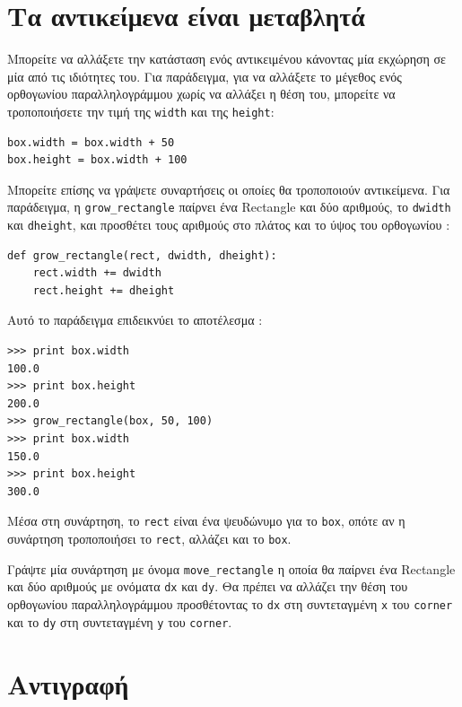 \documentclass[10pt]{book}
\begin{document}
 
\section{Τα αντικείμενα είναι μεταβλητά}

Μπορείτε να αλλάξετε την κατάσταση ενός αντικειμένου κάνοντας μία εκχώρηση σε μία από τις ιδιότητες του. 
Για παράδειγμα, για να αλλάξετε το μέγεθος ενός ορθογωνίου παραλληλογράμμου χωρίς να αλλάξει η θέση του, μπορείτε να 
τροποποιήσετε την τιμή της  {\tt width}  και της  {\tt height}:

\begin{verbatim}
box.width = box.width + 50
box.height = box.width + 100
\end{verbatim}
%
 Μπορείτε επίσης να γράψετε συναρτήσεις οι οποίες θα τροποποιούν αντικείμενα. Για παράδειγμα, η  \verb"grow_rectangle"  παίρνει ένα  Rectangle  και δύο αριθμούς, το  {\tt dwidth}  και  {\tt dheight},  και προσθέτει τους αριθμούς 
στο πλάτος και το ύψος του ορθογωνίου :

\begin{verbatim}
def grow_rectangle(rect, dwidth, dheight):
    rect.width += dwidth
    rect.height += dheight
\end{verbatim}
%
 Αυτό το παράδειγμα επιδεικνύει το αποτέλεσμα :

\begin{verbatim}
>>> print box.width
100.0
>>> print box.height
200.0
>>> grow_rectangle(box, 50, 100)
>>> print box.width
150.0
>>> print box.height
300.0
\end{verbatim}
%
 Μέσα στη συνάρτηση, το  {\tt rect}  είναι ένα ψευδώνυμο για το  {\tt box},  οπότε αν η συνάρτηση τροποποιήσει το  
{\tt rect},  αλλάζει και το  {\tt box}.

\begin{exercise}

Γράψτε μία συνάρτηση με όνομα  \verb"move_rectangle"  η οποία θα παίρνει ένα  Rectangle  και δύο αριθμούς με ονόματα  {\tt dx}  και  {\tt dy}.   Θα πρέπει να αλλάζει την θέση του ορθογωνίου παραλληλογράμμου προσθέτοντας το  {\tt dx}  στη συντεταγμένη  {\tt x}  του  {\tt corner}  και το  {\tt dy}  στη συντεταγμένη  {\tt y}  του  {\tt corner}. 
\end{exercise}



\section{Αντιγραφή}
\label{copying}
\end{document}
